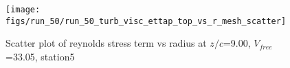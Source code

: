 \begin{figure}[H]
\centering
\texttt{[image: figs/run\_50/run\_50\_turb\_visc\_ettap\_top\_vs\_r\_mesh\_scatter]}
\caption{Scatter plot of reynolds stress term vs radius at $z/c$=9.00, $V_{free}$=33.05, station5}
\label{fig:run_50_turb_visc_ettap_top_vs_r_mesh_scatter}
\end{figure}


